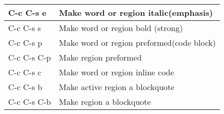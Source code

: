 \documentclass[landscape, zihao=5]{ctexart}
\begin{document}
\thispagestyle{empty} %


\begin{multicols}{3}
  \begin{tabu}{|X[1]|X[3]|}
    \hline
    C-c C-s e   & Make word or region italic(emphasis)      \\ \hline
    C-c C-s s   & Make word or region bold (strong)         \\ \hline
    C-c C-s p   & Make word or region preformed(code block) \\ \hline
    C-c C-s C-p & Make region preformed                     \\ \hline
    C-c C-s c   & Make word or region inline code           \\ \hline
    C-c C-s b   & Make active region a blockquote           \\ \hline
    C-c C-s C-b & Make region a blockquote                  \\ \hline


\end{tabu}
\end{multicols}
\end{document}
